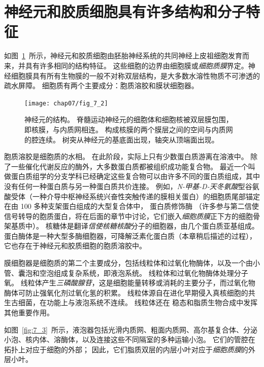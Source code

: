 \section{神经元和胶质细胞具有许多结构和分子特征}

如图~\ref{fig:7_2}~所示，神经元和胶质细胞由胚胎神经系统的共同神经上皮祖细胞发育而来，并具有许多相同的结构特征。
这些细胞的边界由细胞膜或\textit{细胞质膜}界定。神经细胞膜具有所有生物膜的一般不对称双层结构，是大多数水溶性物质不可渗透的疏水屏障。
细胞质有两个主要成分：胞质溶胶和膜状细胞器。


\begin{figure}[htbp]
	\centering
	\texttt{[image: chap07/fig\_7\_2]}
	\caption{神经元的结构。
		脊髓运动神经元的细胞体和细胞核被双层膜包围，即核膜，与内质网相连。
		构成核膜的两个膜层之间的空间与内质网的腔连续。
		树突从神经元的基底面出现，轴突从顶端面出现\cite{williams1989bannister}。}
	\label{fig:7_2}
\end{figure}


胞质溶胶是细胞质的水相。
在此阶段，实际上只有少数蛋白质游离在溶液中。
除了一些催化代谢反应的酶外，大多数蛋白质都被组织成功能复合物。
最近一个叫做蛋白质组学的分支学科已经确定这些复合物可以由许多不同的蛋白质组成，其中没有任何一种蛋白质与另一种蛋白质共价连接。
例如，\textit{N-甲基-D-天冬氨酸}型谷氨酸受体（一种介导中枢神经系统兴奋性突触传递的膜相关蛋白）的细胞质尾部锚定在由 100 多种支架蛋白组成的大型复合体中， 蛋白质修饰酶
（许多参与第二信使信号转导的胞质蛋白，将在后面的章节中讨论，它们嵌入\textit{细胞质膜}正下方的细胞骨架基质中）。
核糖体是翻译\textit{信使核糖核酸}分子的细胞器，由几个蛋白质亚基组成。
蛋白酶体是一种大型多酶细胞器，可降解泛素化蛋白质（本章稍后描述的过程），它也存在于神经元和胶质细胞的胞质溶胶中。


膜细胞器是细胞质的第二个主要成分，包括线粒体和过氧化物酶体，以及一个由小管、囊泡和空泡组成复杂系统，即液泡系统。
线粒体和过氧化物酶体处理分子氧。
线粒体产生\textit{三磷酸腺苷}，这是细胞能量转移或消耗的主要分子，而过氧化物酶体可防止强氧化剂过氧化氢的积累。
线粒体源自在进化早期侵入真核细胞的共生古细菌，在功能上与液泡系统不连续。
线粒体还在  稳态和脂质生物合成中发挥其他重要作用。


如图~\ref{fig:7_3}~所示，液泡器包括光滑内质网、粗面内质网、高尔基复合体、分泌小泡、核内体、溶酶体，以及连接这些不同隔室的多种运输小泡。
它们的管腔在拓扑上对应于细胞的外部；
因此，它们脂质双层的内层小叶对应于\textit{细胞质膜}的外层小叶。


